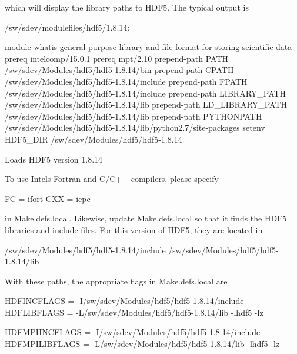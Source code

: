 which will display the library paths to H\+D\+F5. The typical output is \begin{DoxyVerb}/sw/sdev/modulefiles/hdf5/1.8.14:

module-whatis    general purpose library and file format for storing scientific data 
prereq   intelcomp/15.0.1 
prereq   mpt/2.10 
prepend-path     PATH /sw/sdev/Modules/hdf5/hdf5-1.8.14/bin 
prepend-path     CPATH /sw/sdev/Modules/hdf5/hdf5-1.8.14/include 
prepend-path     FPATH /sw/sdev/Modules/hdf5/hdf5-1.8.14/include 
prepend-path     LIBRARY_PATH /sw/sdev/Modules/hdf5/hdf5-1.8.14/lib 
prepend-path     LD_LIBRARY_PATH /sw/sdev/Modules/hdf5/hdf5-1.8.14/lib 
prepend-path     PYTHONPATH /sw/sdev/Modules/hdf5/hdf5-1.8.14/lib/python2.7/site-packages 
setenv           HDF5_DIR /sw/sdev/Modules/hdf5/hdf5-1.8.14 

Loads HDF5 version 1.8.14
\end{DoxyVerb}


To use Intel\textquotesingle{}s Fortran and C/\+C++ compilers, please specify \begin{DoxyVerb} FC  = ifort
 CXX = icpc
\end{DoxyVerb}


in Make.\+defs.\+local. Likewise, update Make.\+defs.\+local so that it finds the H\+D\+F5 libraries and include files. For this version of H\+D\+F5, they are located in \begin{DoxyVerb} /sw/sdev/Modules/hdf5/hdf5-1.8.14/include 
 /sw/sdev/Modules/hdf5/hdf5-1.8.14/lib 
\end{DoxyVerb}


With these paths, the appropriate flags in Make.\+defs.\+local are \begin{DoxyVerb}HDFINCFLAGS    = -I/sw/sdev/Modules/hdf5/hdf5-1.8.14/include 
HDFLIBFLAGS    = -L/sw/sdev/Modules/hdf5/hdf5-1.8.14/lib -lhdf5 -lz 

HDFMPIINCFLAGS = -I/sw/sdev/Modules/hdf5/hdf5-1.8.14/include 
HDFMPILIBFLAGS = -L/sw/sdev/Modules/hdf5/hdf5-1.8.14/lib -lhdf5 -lz \end{DoxyVerb}
 